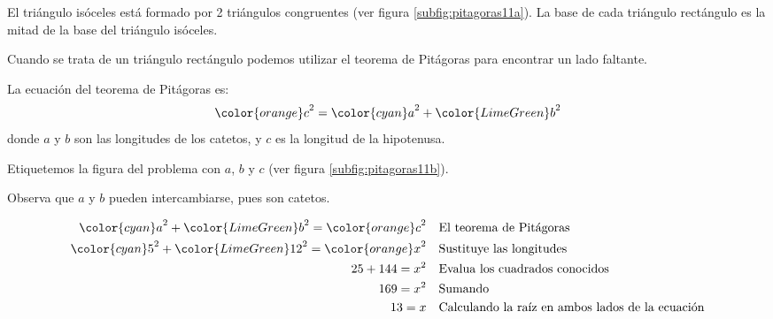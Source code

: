 \begin{solutionbox}{15cm}
    El triángulo isóceles está formado por 2 triángulos congruentes (ver figura \ref{subfig:pitagoras11a}).
    La base de cada triángulo rectángulo es la mitad de la base del triángulo isóceles.

    Cuando se trata de un triángulo rectángulo podemos utilizar el teorema de Pitágoras para encontrar un lado faltante.

    La ecuación del teorema de Pitágoras es:
    \[{\color{orange}c}^2={\color{cyan}a}^2+{\color{LimeGreen}b}^2\]
    donde $a$ y $b$ son las longitudes de los catetos, y $c$ es la longitud de la hipotenusa.

    Etiquetemos la figura del problema con $a$, $b$ y $c$ (ver figura \ref{subfig:pitagoras11b}).

    Observa que $a$ y $b$ pueden intercambiarse, pues son catetos.

    \begin{align*}
        {\color{cyan}a}^2+{\color{LimeGreen}b}^2  ={\color{orange}c}^2  & \text{\quad El teorema de Pitágoras}                          \\
        {\color{cyan}5}^2+{\color{LimeGreen}12}^2  ={\color{orange}x}^2 & \text{\quad Sustituye las longitudes}                         \\
        25+144  =x^2                                                    & \text{\quad Evalua los cuadrados conocidos}                   \\
        169=x^2                                                         & \text{\quad Sumando }                                         \\
        13=x                                                            & \text{\quad Calculando la raíz en ambos lados de la ecuación} \\
    \end{align*}

\end{solutionbox}
